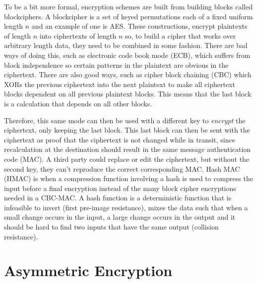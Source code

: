 \documentclass[ %
                    author={Samuel Russell},
                supervisor={Prof. Bogdan Warinschi},
                    degree={MEng},
                     title={Innocuous Ciphertexts},
                  subtitle={The DE-CENSOR Scheme},
                      type={Research},
                      year={2018} ]{dissertation}
\begin{document}
To be a bit more formal, encryption schemes are built from building blocks called blockciphers.
A blockcipher is a set of keyed permutations each of a fixed uniform length $n$ and an example of one is AES.
These constructions, encrypt plaintexts of length $n$ into ciphertexts of length $n$ so, to build a cipher that works over arbitrary length data, they need to be combined in some fashion.
There are bad ways of doing this, such as electronic code book mode (ECB), which suffers from block independence so certain patterns in the plaintext are obvious in the ciphertext.
There are also good ways, such as cipher block chaining (CBC) which XORs the previous ciphertext into the next plaintext to make all ciphertext blocks dependent on all previous plaintext blocks.
This means that the last block is a calculation that depends on all other blocks.

Therefore, this same mode can then be used with a different key to \textit{encrypt} the ciphertext, only keeping the last block. This last block can then be sent with the ciphertext as proof that the ciphertext is not changed while in transit, since recalculation at the destination should result in the same message authentication code (MAC).
A third party could replace or edit the ciphertext, but without the second key, they can't reproduce the correct corresponding MAC.
Hash MAC (HMAC) is when a compression function involving a hash is used to compress the input before a final encryption instead of the many block cipher encryptions needed in a CBC-MAC.
A hash function is a deterministic function that is infeasible to invert (first pre-image resistance), mixes the data such that when a small change occurs in the input, a large change occurs in the output and it should be hard to find two inputs that have the same output (collision resistance).

\section{Asymmetric Encryption}
\end{document}

